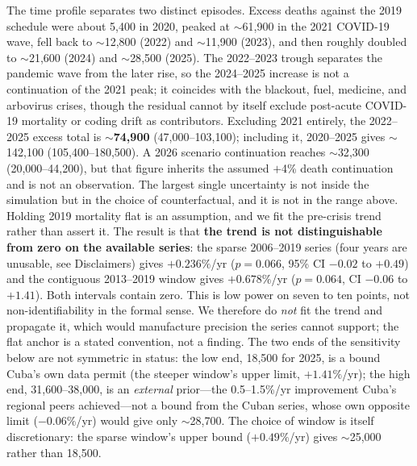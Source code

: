\documentclass[11pt,a4paper]{article}
\begin{document}
The time profile separates two distinct episodes.
Excess deaths against the 2019 schedule were about 5{,}400 in 2020, peaked at $\sim$61{,}900 in the 2021 COVID-19 wave, fell back to $\sim$12{,}800 (2022) and $\sim$11{,}900 (2023), and then roughly doubled to $\sim$21{,}600 (2024) and $\sim$28{,}500 (2025).
The 2022--2023 trough separates the pandemic wave from the later rise, so the 2024--2025 increase is not a continuation of the 2021 peak; it coincides with the blackout, fuel, medicine, and arbovirus crises, though the residual cannot by itself exclude post-acute COVID-19 mortality or coding drift as contributors.
Excluding 2021 entirely, the 2022--2025 excess total is $\sim$\textbf{74{,}900} (47{,}000--103{,}100); including it, 2020--2025 gives $\sim$142{,}100 (105{,}400--180{,}500).
A 2026 scenario continuation reaches $\sim$32{,}300 (20{,}000--44{,}200), but that figure inherits the assumed $+$4\% death continuation and is not an observation.
The largest single uncertainty is not inside the simulation but in the choice of counterfactual, and it is not in the range above.
Holding 2019 mortality flat is an assumption, and we fit the pre-crisis trend rather than assert it. The result is that \textbf{the trend is not distinguishable from zero on the available series}: the sparse 2006--2019 series (four years are unusable, see Disclaimers) gives $+0.236\%$/yr ($p=0.066$, 95\% CI $-0.02$ to $+0.49$) and the contiguous 2013--2019 window gives $+0.678\%$/yr ($p=0.064$, CI $-0.06$ to $+1.41$). Both intervals contain zero. This is low power on seven to ten points, not non-identifiability in the formal sense. We therefore do \emph{not} fit the trend and propagate it, which would manufacture precision the series cannot support; the flat anchor is a stated convention, not a finding. The two ends of the sensitivity below are not symmetric in status: the low end, 18{,}500 for 2025, is a bound Cuba's own data permit (the steeper window's upper limit, $+1.41\%$/yr); the high end, 31{,}600--38{,}000, is an \emph{external} prior---the 0.5--1.5\%/yr improvement Cuba's regional peers achieved---not a bound from the Cuban series, whose own opposite limit ($-0.06\%$/yr) would give only $\sim$28{,}700. The choice of window is itself discretionary: the sparse window's upper bound ($+0.49\%$/yr) gives $\sim$25{,}000 rather than 18{,}500.
\end{document}
